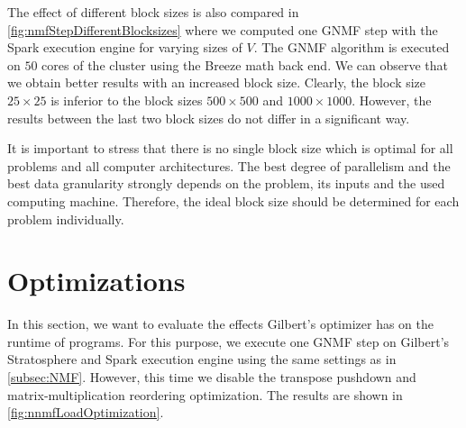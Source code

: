 The effect of different block sizes is also compared in \cref{fig:nmfStepDifferentBlocksizes} where we computed one GNMF step with the Spark execution engine for varying sizes of $V$.
The GNMF algorithm is executed on $50$ cores of the cluster using the Breeze math back end.
We can observe that we obtain better results with an increased block size.
Clearly, the block size $25 \times 25$ is inferior to the block sizes $500\times 500$ and $1000\times 1000$.
However, the results between the last two block sizes do not differ in a significant way.

It is important to stress that there is no single block size which is optimal for all problems and all computer architectures.
The best degree of parallelism and the best data granularity strongly depends on the problem, its inputs and the used computing machine.
Therefore, the ideal block size should be determined for each problem individually.

\section{Optimizations}

In this section, we want to evaluate the effects Gilbert's optimizer has on the runtime of programs.
For this purpose, we execute one GNMF step on Gilbert's Stratosphere and Spark execution engine using the same settings as in \cref{subsec:NMF}.
However, this time we disable the transpose pushdown and matrix-multiplication reordering optimization.
The results are shown in \cref{fig:nnmfLoadOptimization}.

